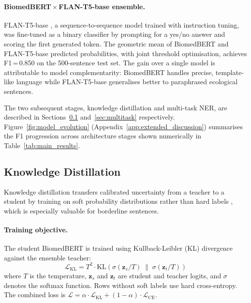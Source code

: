 \documentclass[11pt,twocolumn]{article}
\begin{document}
\paragraph{BiomedBERT\,$\times$\,FLAN-T5-base ensemble.}
FLAN-T5-base \citep{chung2022scaling}, a sequence-to-sequence model trained
with instruction tuning, was fine-tuned as a binary classifier by prompting
for a yes/no answer and scoring the first generated token. The geometric
mean of BiomedBERT and FLAN-T5-base predicted probabilities, with joint
threshold optimisation, achieves F1\,=\,0.850 on the 500-sentence test set.
The gain over a single model is attributable to model complementarity:
BiomedBERT handles precise, template-like language while FLAN-T5-base
generalises better to paraphrased ecological sentences.

The two subsequent stages, knowledge distillation and multi-task NER, are
described in Sections~\ref{sec:distillation} and~\ref{sec:multitask}
respectively. Figure~\ref{fig:model_evolution} (Appendix~\ref{app:extended_discussion})
summarises the F1 progression across architecture stages shown numerically
in Table~\ref{tab:main_results}.

\subsection{Knowledge Distillation}
\label{sec:distillation}

Knowledge distillation \citep{hinton2015distilling} transfers calibrated
uncertainty from a teacher to a student by training on soft probability
distributions rather than hard labels \citep{bucilua2006model}, which is
especially valuable for borderline sentences.

\paragraph{Training objective.}
The student BiomedBERT is trained using Kullback-Leibler (KL) divergence
against the ensemble teacher:
\begin{equation}
    \mathcal{L}_\text{KL} = T^2 \cdot \mathrm{KL}\!\left(
        \sigma(\mathbf{z}_s / T) \;\|\; \sigma(\mathbf{z}_t / T)
    \right)
\end{equation}
where $T$ is the temperature, $\mathbf{z}_s$ and $\mathbf{z}_t$ are student
and teacher logits, and $\sigma$ denotes the softmax function.
Rows without soft labels use hard cross-entropy. The combined loss is
$\mathcal{L} = \alpha \cdot \mathcal{L}_\text{KL} + (1{-}\alpha) \cdot \mathcal{L}_\text{CE}$.
\end{document}
